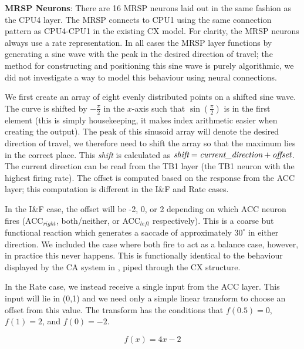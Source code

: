 \documentclass[a4paper,11pt,twoside,openright]{article}
\begin{document}
\textbf{MRSP Neurons}: There are 16 MRSP neurons laid out in the same
fashion as the CPU4 layer. The MRSP connects to CPU1 using the same
connection pattern as CPU4-CPU1 in the existing CX model. For clarity,
the MRSP neurons always use a rate representation. In all cases the
MRSP layer functions by generating a sine wave with the peak in the
desired direction of travel; the method for constructing and
positioning this sine wave is purely algorithmic, we did not
investigate a way to model this behaviour using neural connections.
\newline\par

We first create an array of eight evenly distributed points on a
shifted sine wave.  The curve is shifted by $-\frac{\pi}{2}$ in the
$x$-axis such that $\sin(\frac{\pi}{2})$ is in the first element (this
is simply housekeeping, it makes index arithmetic easier when creating
the output). The peak of this sinusoid array will denote the desired
direction of travel, we therefore need to shift the array so that the
maximum lies in the correct place. This \textit{shift} is calculated
as $\textit{shift} = \textit{current\textunderscore direction} +
\textit{offset}$. The current direction can be read from the TB1 layer
(the TB1 neuron with the highest firing rate). The offset is computed
based on the response from the ACC layer; this computation is
different in the I\&F and Rate cases.
\newline\par

In the I\&F case, the offset will be -2, 0, or 2 depending on which
ACC neuron fires (ACC$_{right}$, both/neither, or ACC$_{left}$
respectively). This is a coarse but functional reaction which
generates a saccade of approximately $30^{\circ}$ in either
direction. We included the case where both fire to act as a balance
case, however, in practice this never happens. This is functionally
identical to the behaviour displayed by the CA system in
\cite{Mitchell2018}, piped through the CX structure.
\newline\par

In the Rate case, we instead receive a single input from the ACC layer.
This input will lie in (0,1) and we need only a simple linear transform to
choose an offset from this value. The transform has the conditions that
$f(0.5) = 0$, $f(1) = 2$, and $f(0) = -2$.

\begin{equation}
  \label{eq:transform}
 f(x) = 4x - 2
\end{equation}
\end{document}

